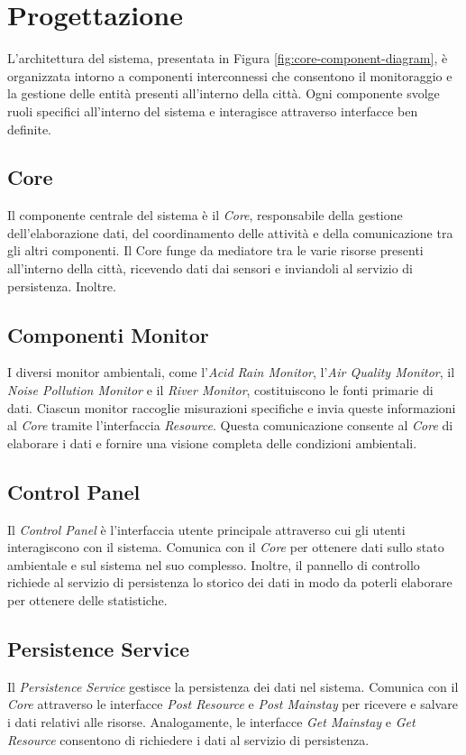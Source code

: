\documentclass[12pt]{article}
\begin{document}
\section{Progettazione}

L'architettura del sistema, presentata in Figura \ref{fig:core-component-diagram}, è organizzata intorno a componenti interconnessi che consentono il monitoraggio e la gestione delle entità presenti all'interno della città. Ogni componente svolge ruoli specifici all'interno del sistema e interagisce attraverso interfacce ben definite.

\subsection{Core}
Il componente centrale del sistema è il \textit{Core}, responsabile della gestione dell'elaborazione dati, del coordinamento delle attività e della comunicazione tra gli altri componenti. Il Core funge da mediatore tra le varie risorse presenti all'interno della città, ricevendo dati dai sensori e inviandoli al servizio di persistenza. Inoltre.

\subsection{Componenti Monitor}
I diversi monitor ambientali, come l'\textit{Acid Rain Monitor}, l'\textit{Air Quality Monitor}, il \textit{Noise Pollution Monitor} e il \textit{River Monitor}, costituiscono le fonti primarie di dati. Ciascun monitor raccoglie misurazioni specifiche e invia queste informazioni al \textit{Core} tramite l'interfaccia \textit{Resource}. Questa comunicazione consente al \textit{Core} di elaborare i dati e fornire una visione completa delle condizioni ambientali.

\subsection{Control Panel}
Il \textit{Control Panel} è l'interfaccia utente principale attraverso cui gli utenti interagiscono con il sistema. Comunica con il \textit{Core} per ottenere dati sullo stato ambientale e sul sistema nel suo complesso. Inoltre, il pannello di controllo richiede al servizio di persistenza lo storico dei dati in modo da poterli elaborare per ottenere delle statistiche.

\subsection{Persistence Service}
Il \textit{Persistence Service} gestisce la persistenza dei dati nel sistema. Comunica con il \textit{Core} attraverso le interfacce \textit{Post Resource} e \textit{Post Mainstay} per ricevere e salvare i dati relativi alle risorse. Analogamente, le interfacce \textit{Get Mainstay} e \textit{Get Resource }consentono di richiedere i dati al servizio di persistenza.
\end{document}
